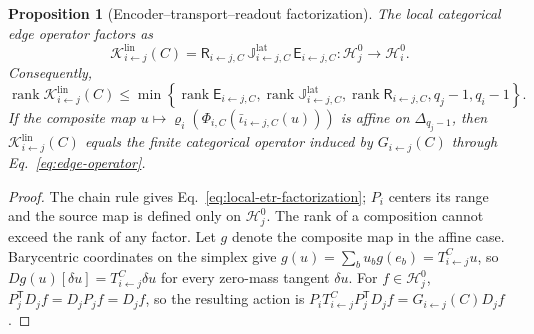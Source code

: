 \documentclass[10pt]{article}
\newtheorem{proposition}[theorem]{Proposition}
\theoremstyle{definition}
\theoremstyle{remark}
\begin{document}
\begin{proposition}[Encoder--transport--readout factorization]
\label{prop:encoder-transport-readout}
The local categorical edge operator factors as
\begin{equation}
\boxed{
\mathcal K_{i\leftarrow j}^{\mathrm{lin}}(C)
=\mathsf R_{i\leftarrow j,C}\,
\mathbb J_{i\leftarrow j,C}^{\mathrm{lat}}\,
\mathsf E_{i\leftarrow j,C}:
\mathcal H_j^0\longrightarrow\mathcal H_i^0.}
\label{eq:local-etr-factorization}
\end{equation}
Consequently,
\begin{equation}
\operatorname{rank}\mathcal K_{i\leftarrow j}^{\mathrm{lin}}(C)
\leq
\min\left\{
\operatorname{rank}\mathsf E_{i\leftarrow j,C},
\operatorname{rank}\mathbb J_{i\leftarrow j,C}^{\mathrm{lat}},
\operatorname{rank}\mathsf R_{i\leftarrow j,C},q_j-1,q_i-1
\right\}.
\label{eq:etr-rank-bound}
\end{equation}
If the composite map
$u\mapsto\varrho_i(\Phi_{i,C}(\bar\iota_{i\leftarrow j,C}(u)))$ is affine on
$\Delta_{q_j-1}$, then
$\mathcal K_{i\leftarrow j}^{\mathrm{lin}}(C)$ equals the finite categorical operator induced by
$G_{i\leftarrow j}(C)$ through Eq.~\ref{eq:edge-operator}.
\end{proposition}

\begin{proof}
The chain rule gives Eq.~\ref{eq:local-etr-factorization}; $P_i$ centers its range and the source
map is defined only on $\mathcal H_j^0$.  The rank of a composition cannot exceed the rank of any
factor.  Let $g$ denote the composite map in the affine case.  Barycentric coordinates on the
simplex give $g(u)=\sum_bu_b g(e_b)=T_{i\leftarrow j}^{C}u$, so
$Dg(u)[\delta u]=T_{i\leftarrow j}^{C}\delta u$ for every zero-mass tangent $\delta u$.  For
$f\in\mathcal H_j^0$,
$P_j^{\mathsf T}D_jf=D_jP_jf=D_jf$, so the resulting action is
$P_iT_{i\leftarrow j}^{C}P_j^{\mathsf T}D_jf=G_{i\leftarrow j}(C)D_jf$.
\end{proof}
\end{document}
